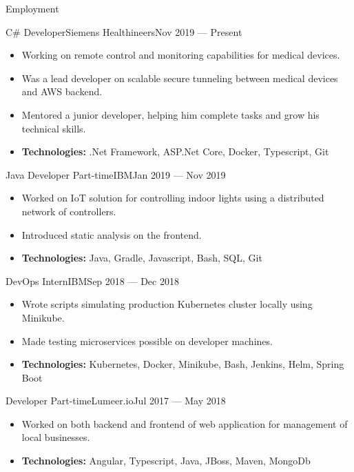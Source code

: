 \documentclass[]{style}
\begin{document}
	\makeheader

	\begin{cvsection}{Employment}
	
    	\begin{cvsubsection}{C\# Developer}{Siemens Healthineers}{Nov 2019 — Present}
			\begin{itemize}
			    \item Working on remote control and monitoring capabilities for medical devices.
			    \item Was a lead developer on scalable secure tunneling between medical devices and AWS backend.
			    \item Mentored a junior developer, helping him complete tasks and grow his technical skills.
			    \item \textbf{Technologies:} .Net Framework, ASP.Net Core, Docker, Typescript, Git
			\end{itemize}
		\end{cvsubsection}
		
    	\begin{cvsubsection}{Java Developer Part-time}{IBM}{Jan 2019 — Nov 2019}
			\begin{itemize}
    			\item Worked on IoT solution for controlling indoor lights using a distributed network of controllers.
    			\item Introduced static analysis on the frontend.
    			\item \textbf{Technologies:} Java, Gradle, Javascript, Bash, SQL, Git
			\end{itemize}
		\end{cvsubsection}
		
    	\begin{cvsubsection}{DevOps Intern}{IBM}{Sep 2018 — Dec 2018}
			\begin{itemize}
			    \item Wrote scripts simulating production Kubernetes cluster locally using Minikube.
			    \item Made testing microservices possible on developer machines.
			    \item \textbf{Technologies:} Kubernetes, Docker, Minikube, Bash, Jenkins, Helm, Spring Boot
			\end{itemize}
		\end{cvsubsection}
		
		\begin{cvsubsection}{Developer Part-time}{Lumeer.io}{Jul 2017 — May 2018}
			\begin{itemize}
			    \item Worked on both backend and frontend of web application for management of local businesses.
				\item \textbf{Technologies:} Angular, Typescript, Java, JBoss, Maven, MongoDb
			\end{itemize}
		\end{cvsubsection}
	\end{cvsection}
	
\end{document}
